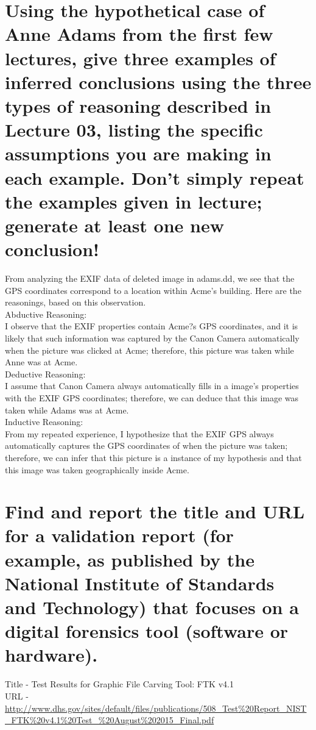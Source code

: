 \documentclass[12pt]{article}
\begin{document}
\section{Using the hypothetical case of Anne Adams from the first few lectures, give three examples of inferred conclusions using the three types of reasoning described in Lecture 03, listing the specific assumptions you are making in each example. Don't simply repeat the examples given in lecture; generate at least one new conclusion!}
From analyzing the EXIF data of deleted image in adams.dd, we see that the GPS coordinates correspond to a location within Acme's building. Here are the reasonings, based on this observation.\\
Abductive Reasoning:\\
I observe that the EXIF properties contain Acme?s GPS coordinates, and it is likely that such information was captured by the Canon Camera automatically when the picture was clicked at Acme; therefore, this picture was taken while Anne was at Acme.\\
Deductive Reasoning:\\
I assume that Canon Camera always automatically fills in a image's properties with the EXIF GPS coordinates; therefore, we can deduce that this image was taken while Adams was at Acme.\\
Inductive Reasoning:\\
From my repeated experience, I hypothesize that the EXIF GPS always automatically captures the GPS coordinates of when the picture was taken; therefore, we can infer that this picture is a instance of my hypothesis and that this image was taken geographically inside Acme.

\section{Find and report the title and URL for a validation report (for example, as published by the National Institute of Standards and Technology) that focuses on a digital forensics tool (software or hardware).}
Title - Test Results for Graphic File Carving Tool: FTK v4.1\\
URL - \url{http://www.dhs.gov/sites/default/files/publications/508_Test%20Report_NIST_FTK%20v4.1%20Test_%20August%202015_Final.pdf}
\end{document}

